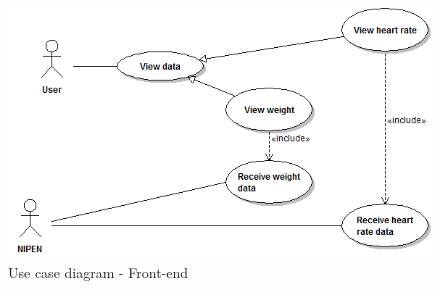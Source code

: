 \begin{figure}[H]
\centering
\includegraphics[scale=0.6]{../Figures/use-case-diagram-front-end.png}
\caption{Use case diagram - Front-end}
\label{figure:use-case-diagram-front-end}
\end{figure}

